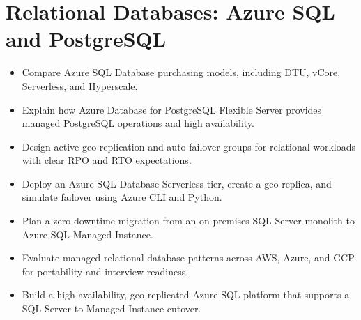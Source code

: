 \chapter{Relational Databases: Azure SQL and PostgreSQL}
%
\begin{objectives}
\begin{itemize}
    \item Compare Azure SQL Database purchasing models, including DTU, vCore, Serverless, and Hyperscale.
    \item Explain how Azure Database for PostgreSQL Flexible Server provides managed PostgreSQL operations and high availability.
    \item Design active geo-replication and auto-failover groups for relational workloads with clear RPO and RTO expectations.
    \item Deploy an Azure SQL Database Serverless tier, create a geo-replica, and simulate failover using Azure CLI and Python.
    \item Plan a zero-downtime migration from an on-premises SQL Server monolith to Azure SQL Managed Instance.
    \item Evaluate managed relational database patterns across AWS, Azure, and GCP for portability and interview readiness.
    \item Build a high-availability, geo-replicated Azure SQL platform that supports a SQL Server to Managed Instance cutover.
\end{itemize}
\end{objectives}

